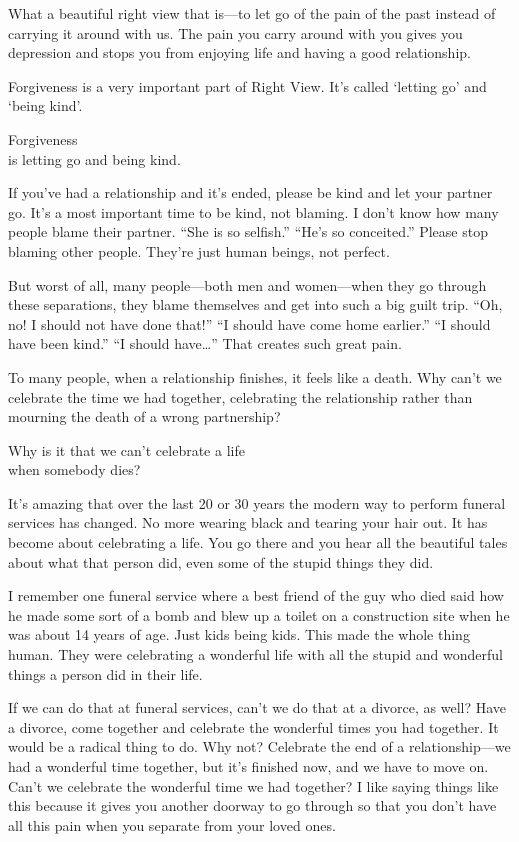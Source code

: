 \documentclass[12pt, openany]{book}
\newenvironment{aphorism}%
{%
\begin{center}\begin{itshape}
}%
{\end{itshape}\end{center}
}%
\begin{document}
What a beautiful right view that is—to let go of the pain of the past instead of carrying it around with us. The pain you carry around with you gives you depression and stops you from enjoying life and having a good relationship. 

Forgiveness is a very important part of Right View. It’s called ‘letting go’ and ‘being kind’. 

\begin{aphorism}
Forgiveness\\  
is letting go and being kind.
\end{aphorism}

If you’ve had a relationship and it’s ended, please be kind and let your partner go. It’s a most important time to be kind, not blaming. I don’t know how many people blame their partner. “She is so selfish.” “He’s so conceited.” Please stop blaming other people. They’re just human beings, not perfect. 

But worst of all, many people—both men and women—when they go through these separations, they blame themselves and get into such a big guilt trip. “Oh, no! I should not have done that!” “I should have come home earlier.” “I should have been kind.” “I should have…” That creates such great pain. 

To many people, when a relationship finishes, it feels like a death. Why can’t we celebrate the time we had together, celebrating the relationship rather than mourning the death of a wrong partnership? 

\begin{aphorism}
Why is it that we can’t celebrate a life\\  
when somebody dies?
\end{aphorism}

It’s amazing that over the last 20 or 30 years the modern way to perform funeral services has changed. No more wearing black and tearing your hair out. It has become about celebrating a life. You go there and you hear all the beautiful tales about what that person did, even some of the stupid things they did. 

I remember one funeral service where a best friend of the guy who died said how he made some sort of a bomb and blew up a toilet on a construction site when he was about 14 years of age. Just kids being kids. This made the whole thing human. They were celebrating a wonderful life with all the stupid and wonderful things a person did in their life. 

If we can do that at funeral services, can’t we do that at a divorce, as well? Have a divorce, come together and celebrate the wonderful times you had together. It would be a radical thing to do. Why not? Celebrate the end of a relationship—we had a wonderful time together, but it’s finished now, and we have to move on. Can’t we celebrate the wonderful time we had together? I like saying things like this because it gives you another doorway to go through so that you don’t have all this pain when you separate from your loved ones. 
\end{document}
